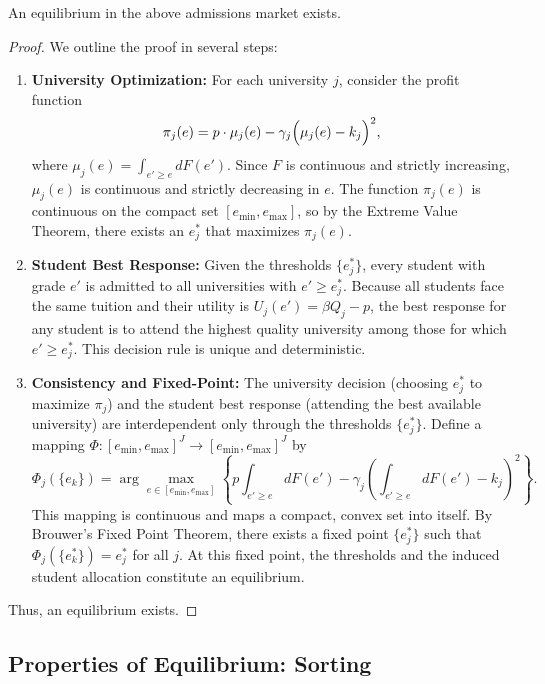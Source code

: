\begin{theorem}
An equilibrium in the above admissions market exists.
\end{theorem}

\begin{proof}
We outline the proof in several steps:
\begin{enumerate}
    \item \textbf{University Optimization:} For each university $j$, consider the profit function
    \[
    \pi_j(e) = p \cdot \mu_j(e) - \gamma_j\Bigl(\mu_j(e)-k_j\Bigr)^2,
    \]
    where $\mu_j(e)=\int_{e' \ge e} dF(e')$. Since $F$ is continuous and strictly increasing, $\mu_j(e)$ is continuous and strictly decreasing in $e$. The function $\pi_j(e)$ is continuous on the compact set $[e_{\min}, e_{\max}]$, so by the Extreme Value Theorem, there exists an $e_j^*$ that maximizes $\pi_j(e)$.

    \item \textbf{Student Best Response:} Given the thresholds $\{e_j^*\}$, every student with grade $e'$ is admitted to all universities with $e' \ge e_j^*$. Because all students face the same tuition and their utility is $U_j(e')=\beta Q_j-p$, the best response for any student is to attend the highest quality university among those for which $e'\ge e_j^*$. This decision rule is unique and deterministic.

    \item \textbf{Consistency and Fixed-Point:} The university decision (choosing $e_j^*$ to maximize $\pi_j$) and the student best response (attending the best available university) are interdependent only through the thresholds $\{e_j^*\}$. Define a mapping $\Phi: [e_{\min}, e_{\max}]^J \to [e_{\min}, e_{\max}]^J$ by
    \[
    \Phi_j(\{e_k\}) = \arg\max_{e\in [e_{\min}, e_{\max}]} \left\{ p \int_{e' \ge e} dF(e') - \gamma_j\left(\int_{e' \ge e} dF(e') - k_j\right)^2 \right\}.
    \]
    This mapping is continuous and maps a compact, convex set into itself. By Brouwer's Fixed Point Theorem, there exists a fixed point $\{e_j^*\}$ such that $\Phi_j(\{e_k^*\}) = e_j^*$ for all $j$. At this fixed point, the thresholds and the induced student allocation constitute an equilibrium.
\end{enumerate}
Thus, an equilibrium exists.
\end{proof}

\subsection{Properties of Equilibrium: Sorting}

